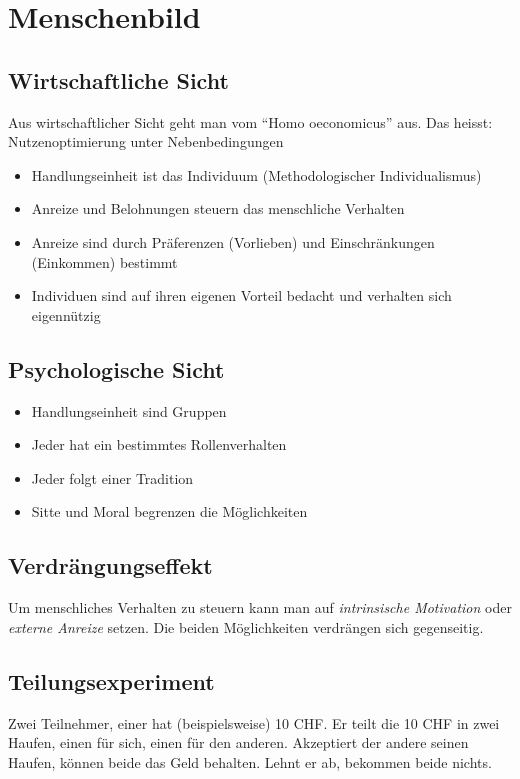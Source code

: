 \section{Menschenbild}
\subsection{Wirtschaftliche Sicht}
Aus wirtschaftlicher Sicht geht man vom \enquote{Homo oeconomicus} aus. Das heisst: Nutzenoptimierung unter Nebenbedingungen
\begin{itemize}\itemsep0em
	\item Handlungseinheit ist das Individuum (Methodologischer Individualismus)
	\item Anreize und Belohnungen steuern das menschliche Verhalten
	\item Anreize sind durch Präferenzen (Vorlieben) und Einschränkungen (Einkommen) bestimmt
	\item Individuen sind auf ihren eigenen Vorteil bedacht und verhalten sich eigennützig
\end{itemize}

\subsection{Psychologische Sicht}
\begin{itemize}\itemsep0em
	\item Handlungseinheit sind Gruppen
	\item Jeder hat ein bestimmtes Rollenverhalten
	\item Jeder folgt einer Tradition
	\item Sitte und Moral begrenzen die Möglichkeiten
\end{itemize}

\subsection{Verdrängungseffekt}
Um menschliches Verhalten zu steuern kann man auf \textit{intrinsische Motivation} oder \textit{externe Anreize} setzen.
Die beiden Möglichkeiten verdrängen sich gegenseitig.

\subsection{Teilungsexperiment}
Zwei Teilnehmer, einer hat (beispielsweise) 10 CHF. Er teilt die 10 CHF in zwei Haufen, einen für sich, einen für den anderen.
Akzeptiert der andere seinen Haufen, können beide das Geld behalten. Lehnt er ab, bekommen beide nichts.

